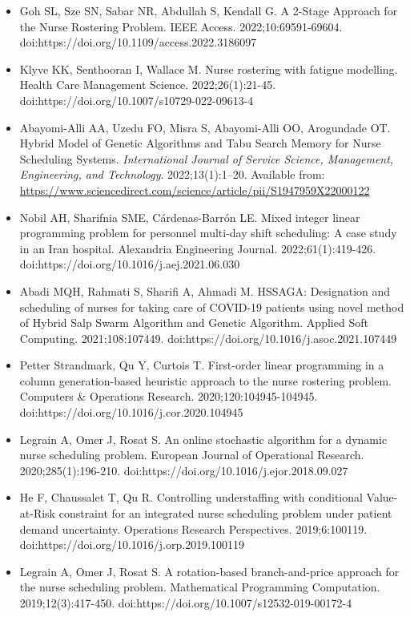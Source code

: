 \documentclass[10pt,a4paper,twocolumn]{article}
\begin{document}
\begin{itemize}[leftmargin=*]
\item [9] Goh SL, Sze SN, Sabar NR, Abdullah S, Kendall G. A 2-Stage Approach for the Nurse Rostering Problem. IEEE Access. 2022;10:69591-69604. doi:https://doi.org/10.1109/access.2022.3186097
\item [10] Klyve KK, Senthooran I, Wallace M. Nurse rostering with fatigue modelling. Health Care Management Science. 2022;26(1):21-45. doi:https://doi.org/10.1007/s10729-022-09613-4
\item [11] Abayomi-Alli AA, Uzedu FO, Misra S, Abayomi-Alli OO, Arogundade OT. Hybrid Model of Genetic Algorithms and Tabu Search Memory for Nurse Scheduling Systems. \textit{International Journal of Service Science, Management, Engineering, and Technology}. 2022;13(1):1–20. Available from: \url{https://www.sciencedirect.com/science/article/pii/S1947959X22000122}
\item [12] Nobil AH, Sharifnia SME, Cárdenas-Barrón LE. Mixed integer linear programming problem for personnel multi-day shift scheduling: A case study in an Iran hospital. Alexandria Engineering Journal. 2022;61(1):419-426. doi:https://doi.org/10.1016/j.aej.2021.06.030
\item [13] Abadi MQH, Rahmati S, Sharifi A, Ahmadi M. HSSAGA: Designation and scheduling of nurses for taking care of COVID-19 patients using novel method of Hybrid Salp Swarm Algorithm and Genetic Algorithm. Applied Soft Computing. 2021;108:107449. doi:https://doi.org/10.1016/j.asoc.2021.107449
\item [14] Petter Strandmark, Qu Y, Curtois T. First-order linear programming in a column generation-based heuristic approach to the nurse rostering problem. Computers \& Operations Research. 2020;120:104945-104945. doi:https://doi.org/10.1016/j.cor.2020.104945
\item [15] Legrain A, Omer J, Rosat S. An online stochastic algorithm for a dynamic nurse scheduling problem. European Journal of Operational Research. 2020;285(1):196-210. doi:https://doi.org/10.1016/j.ejor.2018.09.027
\item [16] He F, Chaussalet T, Qu R. Controlling understaffing with conditional Value-at-Risk constraint for an integrated nurse scheduling problem under patient demand uncertainty. Operations Research Perspectives. 2019;6:100119. doi:https://doi.org/10.1016/j.orp.2019.100119
\item [17] Legrain A, Omer J, Rosat S. A rotation-based branch-and-price approach for the nurse scheduling problem. Mathematical Programming Computation. 2019;12(3):417-450. doi:https://doi.org/10.1007/s12532-019-00172-4

\end{itemize}
\end{document}
